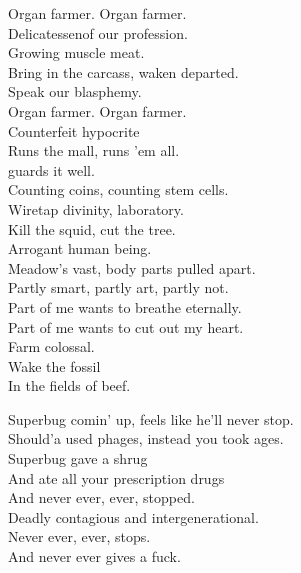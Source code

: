 Organ farmer. Organ farmer. \\

Delicatessenof our profession. \\
Growing muscle meat. \\
Bring in the carcass, waken departed. \\
Speak our blasphemy. \\

Organ farmer. Organ farmer. \\

Counterfeit hypocrite \\
Runs the mall, runs 'em all. \\
 guards it well. \\
Counting coins, counting stem cells. \\
Wiretap divinity,  laboratory. \\

Kill the squid, cut the tree. \\
Arrogant human being. \\
Meadow's vast, body parts pulled apart. \\
Partly smart, partly art, partly not. \\
Part of me wants to breathe eternally. \\
Part of me wants to cut out my heart. \\

Farm colossal. \\
Wake the fossil \\
In the fields of beef. \\





Superbug comin' up, feels like he'll never stop. \\
Should'a used phages, instead you took ages. \\
Superbug gave a shrug \\
And ate all your prescription drugs \\
And never ever, ever, stopped. \\

Deadly contagious and intergenerational. \\
Never ever, ever, stops. \\
And never ever gives a fuck. \\

